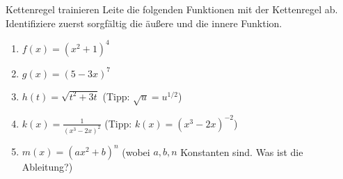 \begin{aufgabenumgebung}{Kettenregel trainieren}
Leite die folgenden Funktionen mit der Kettenregel ab. Identifiziere zuerst sorgfältig die äußere und die innere Funktion.
\begin{enumerate}
    \item $f(x) = (x^2+1)^4$
    \item $g(x) = (5-3x)^7$
    \item $h(t) = \sqrt{t^2+3t}$ (Tipp: $\sqrt{u} = u^{1/2}$)
    \item $k(x) = \frac{1}{(x^3-2x)^2}$ (Tipp: $k(x) = (x^3-2x)^{-2}$)
    \item $m(x) = (ax^2+b)^n$ (wobei $a,b,n$ Konstanten sind. Was ist die Ableitung?)
\end{enumerate}
\end{aufgabenumgebung}

